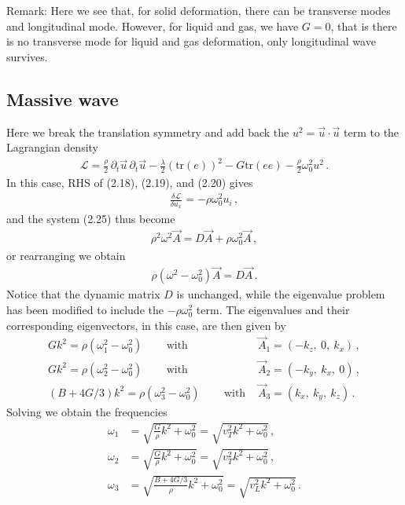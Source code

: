 \documentclass[11pt, onesided]{book}
\theoremstyle{break}
\theoremstyle{break}
\newcommand{\pd}{\partial}
\newcommand{\remark}{\color{blue}Remark: \color{black}}
\begin{document}
\remark Here we see that, for solid deformation, there can be transverse modes and longitudinal mode. However, for liquid and gas, we have $G = 0$, that is there is no transverse mode for liquid and gas deformation, only longitudinal wave survives. \\

\subsection{Massive wave}
Here we break the translation symmetry and add back the $u^2 = \vec{u}\cdot \vec{u}$ term to the Lagrangian density
\begin{align*}
\mathcal{L} = \frac{\rho}{2}\,\pd_t \vec{u}\, \pd_t \vec{u} -\frac{\lambda}{2}(\text{tr}(e))^2 - G\text{tr}(ee) - \frac{\rho}{2}\omega_0^2 u^2\,.
\end{align*}
In this case, RHS of (2.18), (2.19), and (2.20) gives
\begin{align*}
\frac{\delta \mathcal{L}}{\delta u_x} = -\rho \omega_0^2 u_i\,,
\end{align*}
and the system (2.25) thus become
\begin{align*}
\rho^2 \omega^2 \vec{A} = D\vec{A} + \rho\omega_0^2\vec{A}\,,
\end{align*}
or rearranging we obtain
\begin{align}
\rho(\omega^2 - \omega_0^2) \vec{A} = D\vec{A}\,.
\end{align}
Notice that the dynamic matrix $D$ is unchanged, while the eigenvalue problem has been modified to include the $-\rho \omega_0^2$ term. The eigenvalues and their corresponding eigenvectors, in this case, are then given by
\begin{align*}
Gk^2 = \rho(\omega_1^2 - \omega_0^2)\,\qquad \text{with } &\vec{A}_1 = (-k_z,\ 0,\ k_x)\,,\\
Gk^2 = \rho(\omega_2^2 - \omega_0^2)\,\qquad\text{with } &\vec{A}_2 = (-k_y,\ k_x,\ 0)\,,\\
\left( B +4G/3\right)k^2 = \rho(\omega_3^2 - \omega_0^2) \,\qquad 
\text{with } &\vec{A}_3 = (k_x,\ k_y,\ k_z)\,.
\end{align*}
Solving we obtain the frequencies
\begin{align*}
\omega_1 &= \sqrt{\frac{G}{\rho}k^2 + \omega_0^2} = \sqrt{v_T^2k^2 + \omega_0^2}\,, \\
\omega_2 &= \sqrt{\frac{G}{\rho}k^2 + \omega_0^2} = \sqrt{v_T^2k^2 + \omega_0^2}\,, \\
\omega_3 &= \sqrt{\frac{B+4G/3}{\rho} k^2 + \omega_0^2} = \sqrt{v_L^2k^2 + \omega_0^2}\,.
\end{align*}
\end{document}
